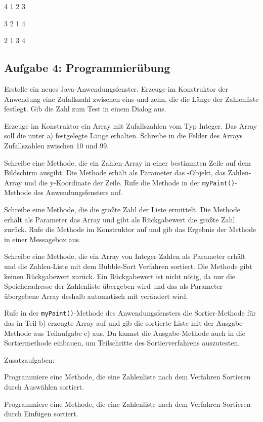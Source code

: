 \begin{compactenum}[a)]
\item 4  1  2  3
\item 3  2  1  4
\item 2  1  3  4
\end{compactenum}


\subsection{Aufgabe 4: Programmierübung}

\begin{compactenum}[a)]
\item Erstelle ein neues Java-Anwendungsfenster. Erzeuge im Konstruktor der
Anwendung eine Zufallszahl zwischen eins und zehn, die die Länge der
Zahlenliste festlegt. Gib die Zahl zum Test in einem Dialog aus.

\item Erzeuge im Konstruktor ein Array mit Zufallszahlen vom Typ Integer. Das
Array soll die unter a) festgelegte Länge erhalten. Schreibe in die Felder des
Arrays Zufallszahlen zwischen 10 und 99.

\item Schreibe eine Methode, die ein Zahlen-Array in einer bestimmten Zeile auf
dem Bildschirm ausgibt. Die Methode erhält als Parameter das
-Objekt, das Zahlen-Array und die y-Koordinate der Zeile.
Rufe die Methode in der \lstinline|myPaint()|-Methode des Anwendungsfensters
auf.

\item Schreibe eine Methode, die die größte Zahl der Liste ermittelt. Die
Methode erhält als Parameter das Array und gibt als Rückgabewert die größte
Zahl zurück. Rufe die Methode im Konstruktor auf und gib das Ergebnis der
Methode in einer Messagebox aus.

\item Schreibe eine Methode, die ein Array von Integer-Zahlen als Parameter
erhält und die Zahlen-Liste mit dem Bubble-Sort Verfahren sortiert. Die Methode
gibt keinen Rückgabewert zurück. Ein Rückgabewert ist nicht nötig, da nur die
Speicheradresse der Zahlenliste übergeben wird und das als Parameter übergebene
Array deshalb automatisch mit verändert wird.

Rufe in der \lstinline|myPaint()|-Methode des Anwendungsfensters die
Sortier-Methode für das in Teil b) erzeugte Array auf und gib die sortierte
Liste mit der Ausgabe-Methode aus Teilaufgabe c) aus. Du kannst die
Ausgabe-Methode auch in die Sortiermethode einbauen, um Teilschritte 
des Sortierverfahrens auszutesten.
\end{compactenum}

Zusatzaufgaben:

\begin{compactenum}[a)]
\setcounter{enumi}{5}
\item Programmiere eine Methode, die eine Zahlenliste nach dem Verfahren
Sortieren durch Auswählen sortiert.

\item Programmiere eine Methode, die eine Zahlenliste nach dem Verfahren
Sortieren durch Einfügen sortiert.
\end{compactenum}
